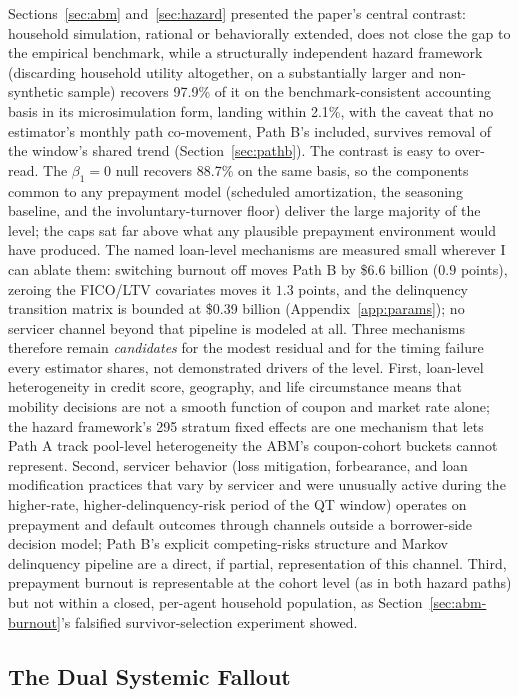 \documentclass[12pt]{article}
\begin{document}
Sections~\ref{sec:abm} and~\ref{sec:hazard} presented the paper's central contrast: household simulation, rational or behaviorally extended, does not close the gap to the empirical benchmark, while a structurally independent hazard framework (discarding household utility altogether, on a substantially larger and non-synthetic sample) recovers 97.9\% of it on the benchmark-consistent accounting basis in its microsimulation form, landing within 2.1\%, with the caveat that no estimator's monthly path co-movement, Path B's included, survives removal of the window's shared trend (Section~\ref{sec:pathb}). The contrast is easy to over-read. The $\beta_1 = 0$ null recovers 88.7\% on the same basis, so the components common to any prepayment model (scheduled amortization, the seasoning baseline, and the involuntary-turnover floor) deliver the large majority of the level; the caps sat far above what any plausible prepayment environment would have produced. The named loan-level mechanisms are measured small wherever I can ablate them: switching burnout off moves Path B by \$6.6 billion ($0.9$ points), zeroing the FICO/LTV covariates moves it $1.3$ points, and the delinquency transition matrix is bounded at \$0.39 billion (Appendix~\ref{app:params}); no servicer channel beyond that pipeline is modeled at all. Three mechanisms therefore remain \emph{candidates} for the modest residual and for the timing failure every estimator shares, not demonstrated drivers of the level. First, loan-level heterogeneity in credit score, geography, and life circumstance means that mobility decisions are not a smooth function of coupon and market rate alone; the hazard framework's 295 stratum fixed effects are one mechanism that lets Path A track pool-level heterogeneity the ABM's coupon-cohort buckets cannot represent. Second, servicer behavior (loss mitigation, forbearance, and loan modification practices that vary by servicer and were unusually active during the higher-rate, higher-delinquency-risk period of the QT window) operates on prepayment and default outcomes through channels outside a borrower-side decision model; Path B's explicit competing-risks structure and Markov delinquency pipeline are a direct, if partial, representation of this channel. Third, prepayment burnout is representable at the cohort level (as in both hazard paths) but not within a closed, per-agent household population, as Section~\ref{sec:abm-burnout}'s falsified survivor-selection experiment showed.

\subsection{The Dual Systemic Fallout}\label{sec:discussion-fallout}
\end{document}
